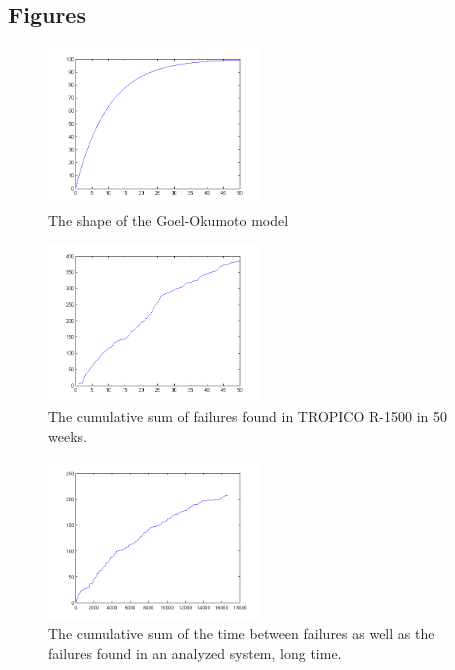 \subsection*{Figures}

\begin{figure}[htb!]
\centering
	\includegraphics[width=0.5\textwidth]{mshape.png}
\caption{The shape of the Goel-Okumoto model}
\label{goelokumoto}
\end{figure}


\begin{figure}[htb!]
\begin{center}
	\includegraphics[width=0.5\textwidth]{cumsumgodata1plot.png}
\caption{The cumulative sum of failures found in TROPICO R-1500 in 50 weeks.}
\end{center}
\label{cumulativegodata1}
\end{figure}

\begin{figure}[htb!]
\begin{center}
	\includegraphics[width=0.5\textwidth]{cumsumjmdata2.png}
\caption{The cumulative sum of the time between failures as well as the failures found in an analyzed system, long time.}
\end{center}
\label{cumulativejmdata2}
\end{figure}


